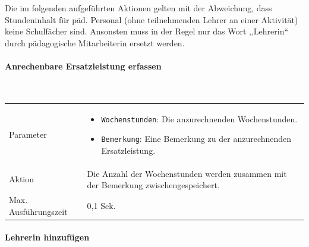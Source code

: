 \documentclass[fontsize=12pt,paper=a4,twoside]{scrartcl}
\begin{document}
Die im folgenden aufgeführten Aktionen gelten mit der Abweichung, dass Stundeninhalt für päd. Personal (ohne teilnehmenden Lehrer an einer Aktivität) keine Schulfächer sind. Ansonsten muss in der Regel nur das Wort ,,Lehrerin`` durch pädagogische Mitarbeiterin ersetzt werden.\\

\paragraph{Anrechenbare Ersatzleistung erfassen}\mbox{}\\

\begin{tabularx}{\textwidth}{p{4cm}X}
Parameter & \begin{itemize}[itemsep=0pt, leftmargin = 0.5cm]
			\item \texttt{Wochenstunden}: Die anzurechnenden Wochenstunden.
			\item \texttt{Bemerkung}: Eine Bemerkung zu der anzurechnenden Ersatzleistung.
			\end{itemize}\\
Aktion & Die Anzahl der Wochenstunden werden zusammen mit der Bemerkung  zwischengespeichert.\\
Max. Ausführungszeit & 0,1 Sek. 
\end{tabularx}

\clearpage
\paragraph{Lehrerin hinzufügen}\mbox{}\\
\end{document}
